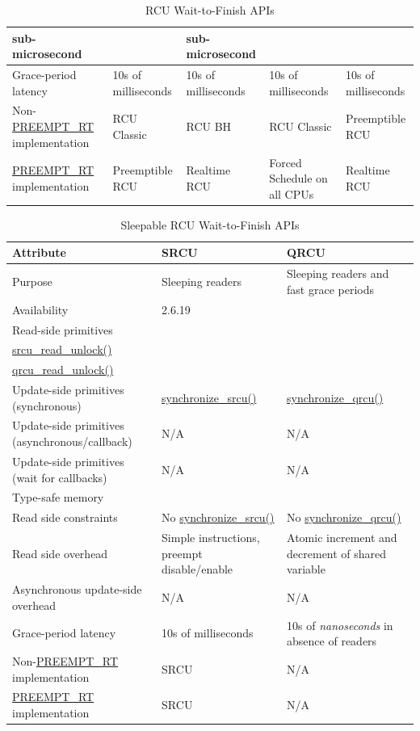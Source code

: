 \begin{table}[p]
\begin{center}
\begin{tabular}{p{1.1in}|p{1.0in}|p{1.1in}|p{1.0in}|p{1.0in}}
	sub-microsecond &
	    &
	        sub-microsecond \\
\hline
Grace-period latency &
    10s of milliseconds &
	10s of milliseconds &
	    10s of milliseconds &
	        10s of milliseconds \\
\hline
Non-\url{PREEMPT_RT} implementation &
    RCU Classic &
	RCU BH &
	    RCU Classic &
	        Preemptible RCU \\
\hline
\url{PREEMPT_RT} implementation &
    Preemptible RCU &
	Realtime RCU &
	    Forced Schedule on all CPUs &
	        Realtime RCU \\
\end{tabular}
\end{center}
\caption{RCU Wait-to-Finish APIs}
\label{tab:defer:RCU Wait-to-Finish APIs}
\end{table}

\begin{table}[p]
\begin{center}
\scriptsize
\begin{tabular}{p{1.1in}|p{1.5in}|p{1.5in}}
Attribute &
    SRCU &
	QRCU \\
\hline
\hline
Purpose &
    Sleeping readers &
	Sleeping readers and fast grace periods \\
\hline
Availability &
    2.6.19 &
	\\
\hline
Read-side primitives &
    { \raggedright
      \url{srcu_read_lock()} \\
      \url{srcu_read_unlock()} } &
	{ \raggedright
	  \url{qrcu_read_lock()} \\
	  \url{qrcu_read_unlock()} } \\
\hline
{ Update-side primitives (synchronous) } &
    \url{synchronize_srcu()} &
	\url{synchronize_qrcu()} \\
\hline
{ Update-side primitives (asynchronous/callback) } &
    N/A &
	N/A \\
\hline
{ Update-side primitives (wait for callbacks) } &
    N/A &
	N/A \\
\hline
Type-safe memory &
    &
	\\
\hline
Read side constraints &
    No \url{synchronize_srcu()} &
	No \url{synchronize_qrcu()} \\
\hline
Read side overhead &
    Simple instructions, preempt disable/enable &
	Atomic increment and decrement of shared variable \\
\hline
Asynchronous update-side overhead &
    N/A &
	N/A \\
\hline
Grace-period latency &
    10s of milliseconds &
	10s of \emph{nanoseconds} in absence of readers \\
\hline
Non-\url{PREEMPT_RT} implementation &
    SRCU &
	N/A \\
\hline
\url{PREEMPT_RT} implementation &
    SRCU &
	N/A \\
\end{tabular}
\end{center}
\caption{Sleepable RCU Wait-to-Finish APIs}
\label{tab:defer:Sleepable RCU Wait-to-Finish APIs}
\end{table}

